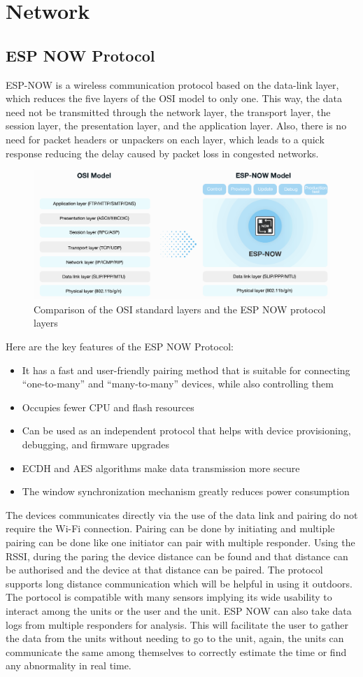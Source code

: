 \section{Network}
\subsection{ESP NOW Protocol}
ESP-NOW is a wireless communication protocol based on the data-link layer, which reduces the five layers of the OSI model to only one. This way, the data need not be transmitted through the network layer, the transport layer, the session layer, the presentation layer, and the application layer. Also, there is no need for packet headers or unpackers on each layer, which leads to a quick response reducing the delay caused by packet loss in congested networks. 
\begin{figure}[H]
    \centering
    \includegraphics[width=0.75\linewidth]{Files/Images/model-en.png}
    \caption{Comparison of the OSI standard layers and the ESP NOW protocol layers}
    \label{fig:enter-label}
\end{figure}
Here are the key features of the ESP NOW Protocol:
\begin{itemize}
    \item It has a fast and user-friendly pairing method that is suitable for connecting “one-to-many” and “many-to-many” devices, while also controlling them
    \item Occupies fewer CPU and flash resources
    \item Can be used as an independent protocol that helps with device provisioning, debugging, and firmware upgrades
    \item  ECDH and AES algorithms make data transmission more secure
    \item The window synchronization mechanism greatly reduces power consumption
\end{itemize}
The devices communicates directly via the use of the data link and pairing do not require the Wi-Fi connection. Pairing can be done by initiating and multiple pairing can be done like one initiator can pair with multiple responder. Using the RSSI, during the paring the device distance can be found and that distance can be authorised and the device at that distance can be paired. The protocol supports long distance communication which will be helpful in using it outdoors. The portocol is compatible with many sensors implying its wide usability to interact among the units or the user and the unit. ESP NOW can also take data logs from multiple responders for analysis. This will facilitate the user to gather the data from the units without needing to go to the unit, again, the units can communicate the same among themselves to correctly estimate the time or find any abnormality in real time. 


